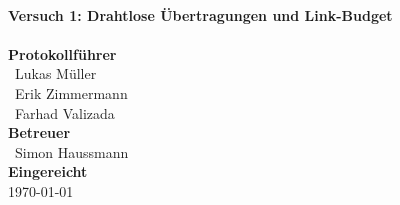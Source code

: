 \documentclass[a4paper, 11pt, oneside]{Thesis}  %
\begin{document}
\begin{titlepage}
\HRule \\[0.4cm]
{ \huge \bfseries Versuch 1: Drahtlose Übertragungen und Link-Budget}\\[0.4cm] %
\HRule \\[1.5cm]
 
\textbf{Protokollführer}\\
{\large\ Lukas Müller}\\[0.2cm]
{\large\ Erik Zimmermann}\\[0.2cm]
{\large\ Farhad Valizada}\\[0.7cm]

\textbf{Betreuer}\\
{\large\ Simon Haussmann}\\[0.2cm]



\textbf{Eingereicht}\\
{\large \today} %

 

\vfill %

\end{titlepage}


\clearpage  %





%
%
\end{document}
